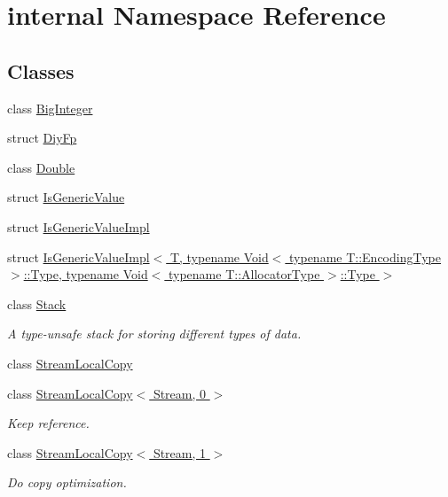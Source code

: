 \hypertarget{namespaceinternal}{}\section{internal Namespace Reference}
\label{namespaceinternal}
\subsection*{Classes}
\begin{DoxyCompactItemize}
\item 
class \hyperlink{classinternal_1_1BigInteger}{Big\+Integer}
\item 
struct \hyperlink{structinternal_1_1DiyFp}{Diy\+Fp}
\item 
class \hyperlink{classinternal_1_1Double}{Double}
\item 
struct \hyperlink{structinternal_1_1IsGenericValue}{Is\+Generic\+Value}
\item 
struct \hyperlink{structinternal_1_1IsGenericValueImpl}{Is\+Generic\+Value\+Impl}
\item 
struct \hyperlink{structinternal_1_1IsGenericValueImpl_3_01T_00_01typename_01Void_3_01typename_01T_1_1EncodingType794abcc01fcce01e300668fa57e4d036}{Is\+Generic\+Value\+Impl$<$ T, typename Void$<$ typename T\+::\+Encoding\+Type $>$\+::\+Type, typename Void$<$ typename T\+::\+Allocator\+Type $>$\+::\+Type $>$}
\item 
class \hyperlink{classinternal_1_1Stack}{Stack}
\begin{DoxyCompactList}\small\item\em A type-\/unsafe stack for storing different types of data. \end{DoxyCompactList}\item 
class \hyperlink{classinternal_1_1StreamLocalCopy}{Stream\+Local\+Copy}
\item 
class \hyperlink{classinternal_1_1StreamLocalCopy_3_01Stream_00_010_01_4}{Stream\+Local\+Copy$<$ Stream, 0 $>$}
\begin{DoxyCompactList}\small\item\em Keep reference. \end{DoxyCompactList}\item 
class \hyperlink{classinternal_1_1StreamLocalCopy_3_01Stream_00_011_01_4}{Stream\+Local\+Copy$<$ Stream, 1 $>$}
\begin{DoxyCompactList}\small\item\em Do copy optimization. \end{DoxyCompactList}\end{DoxyCompactItemize}
